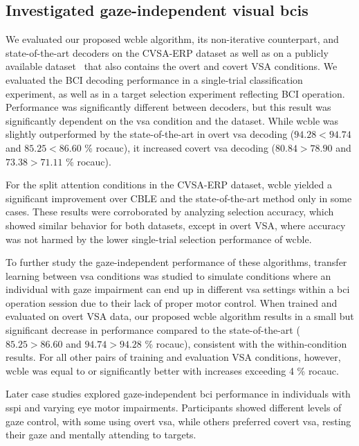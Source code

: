 \subsection{Investigated gaze-independent visual \acsp{bci}}

We evaluated our proposed \ac{wcble} algorithm, its non-iterative
counterpart, and state-of-the-art decoders on the CVSA-ERP dataset as well as on a publicly available
dataset~\cite{Aloise2012} that also contains the overt and covert VSA conditions.
We evaluated the BCI decoding performance in a single-trial classification experiment,
as well as in a target selection experiment reflecting BCI operation.
Performance was significantly different between decoders, but this
result was significantly dependent on the \ac{vsa} condition and the dataset.
While \ac{wcble} was slightly outperformed by the state-of-the-art in overt \ac{vsa}
decoding ($94.28<94.74$ and  $85.25<86.60$ \% \ac{rocauc}),
it increased covert \ac{vsa} decoding ($80.84>78.90$ and $73.38>71.11$ \%
\ac{rocauc}).

For the split attention conditions in the CVSA-ERP
dataset, \ac{wcble} yielded a significant improvement over CBLE and the
state-of-the-art method only in some cases.
These results were corroborated by analyzing selection accuracy, which showed
similar behavior for both datasets, except in overt
VSA, where accuracy was not harmed by the lower
single-trial selection performance of \ac{wcble}.

To further study the gaze-independent performance of these algorithms, transfer
learning between \ac{vsa} conditions was studied to simulate conditions where an
individual with gaze impairment can end up in different \ac{vsa} settings within
a \ac{bci} operation session due to their lack of proper motor control.
When trained and evaluated on overt VSA data, our proposed \ac{wcble} algorithm
results in a small but significant decrease in performance compared to the state-of-the-art
($85.25>86.60$ and $94.74>94.28$ \% \ac{rocauc}), consistent with the within-condition
results.
For all other pairs of training and evaluation VSA conditions, however,
\ac{wcble} was equal to or significantly better with increases exceeding 4 \%
\ac{rocauc}.

Later case studies explored gaze-independent
\ac{bci} performance in individuals with \ac{sspi} and varying eye motor impairments.
Participants showed different levels of gaze control, with some using overt
\ac{vsa}, while others preferred covert \ac{vsa}, resting their gaze and
mentally attending to targets.

